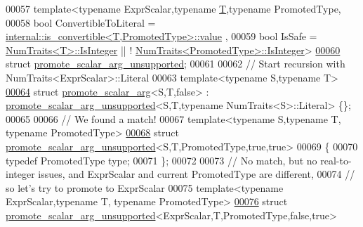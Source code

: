\begin{DoxyCode}
00057 \textcolor{keyword}{template}<\textcolor{keyword}{typename} ExprScalar,\textcolor{keyword}{typename} \hyperlink{group___sparse_core___module}{T},\textcolor{keyword}{typename} PromotedType,
00058   \textcolor{keywordtype}{bool} ConvertibleToLiteral = \hyperlink{struct_eigen_1_1internal_1_1is__convertible}{internal::is\_convertible<T,PromotedType>::value}
      ,
00059   \textcolor{keywordtype}{bool} IsSafe = \hyperlink{group___core___module_struct_eigen_1_1_num_traits}{NumTraits<T>::IsInteger} || !
      \hyperlink{group___core___module_struct_eigen_1_1_num_traits}{NumTraits<PromotedType>::IsInteger}>
\hyperlink{struct_eigen_1_1internal_1_1promote__scalar__arg__unsupported}{00060} \textcolor{keyword}{struct }\hyperlink{struct_eigen_1_1internal_1_1promote__scalar__arg__unsupported}{promote\_scalar\_arg\_unsupported};
00061 
00062 \textcolor{comment}{// Start recursion with NumTraits<ExprScalar>::Literal}
00063 \textcolor{keyword}{template}<\textcolor{keyword}{typename} S,\textcolor{keyword}{typename} T>
\hyperlink{struct_eigen_1_1internal_1_1promote__scalar__arg_3_01_s_00_01_t_00_01false_01_4}{00064} \textcolor{keyword}{struct }\hyperlink{struct_eigen_1_1internal_1_1promote__scalar__arg}{promote\_scalar\_arg}<S,T,false> : 
      \hyperlink{struct_eigen_1_1internal_1_1promote__scalar__arg__unsupported}{promote\_scalar\_arg\_unsupported}<S,T,typename NumTraits<S>::Literal> \{\};
00065 
00066 \textcolor{comment}{// We found a match!}
00067 \textcolor{keyword}{template}<\textcolor{keyword}{typename} S,\textcolor{keyword}{typename} T, \textcolor{keyword}{typename} PromotedType>
\hyperlink{struct_eigen_1_1internal_1_1promote__scalar__arg__unsupported_3_01_s_00_01_t_00_01_promoted_type_00_01true_00_01true_01_4}{00068} \textcolor{keyword}{struct }\hyperlink{struct_eigen_1_1internal_1_1promote__scalar__arg__unsupported}{promote\_scalar\_arg\_unsupported}<S,T,PromotedType,true,true>
00069 \{
00070   \textcolor{keyword}{typedef} PromotedType type;
00071 \};
00072 
00073 \textcolor{comment}{// No match, but no real-to-integer issues, and ExprScalar and current PromotedType are different,}
00074 \textcolor{comment}{// so let's try to promote to ExprScalar}
00075 \textcolor{keyword}{template}<\textcolor{keyword}{typename} ExprScalar,\textcolor{keyword}{typename} T, \textcolor{keyword}{typename} PromotedType>
\hyperlink{struct_eigen_1_1internal_1_1promote__scalar__arg__unsupported_3_01_expr_scalar_00_01_t_00_01_prob0c1a954168835d1f7a6330930c12504}{00076} \textcolor{keyword}{struct }\hyperlink{struct_eigen_1_1internal_1_1promote__scalar__arg__unsupported}{promote\_scalar\_arg\_unsupported}<ExprScalar,T,PromotedType,false,true>

\end{DoxyCode}

